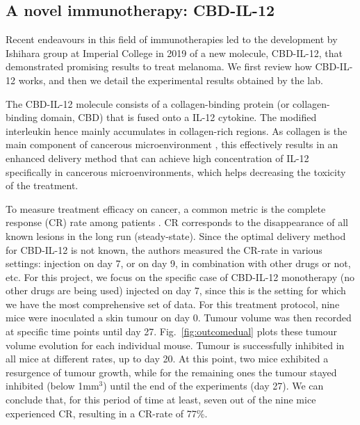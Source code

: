 \documentclass[11pt]{article}
\begin{document}
\subsection{A novel immunotherapy: CBD-IL-12}
Recent endeavours in this field of immunotherapies led to the development by Ishihara group at Imperial College in 2019 \cite{cbdil12} of a new molecule, CBD-IL-12, that demonstrated promising results to treat melanoma. We first review how CBD-IL-12 works, and then we detail the experimental results obtained by the lab. 

The CBD-IL-12  molecule consists of a collagen-binding protein (or collagen-binding domain, CBD) that is fused onto a IL-12 cytokine. The modified interleukin hence mainly accumulates in collagen-rich regions. As collagen is the main component of cancerous microenvironment \cite{collagenInCancer}, this effectively results in an enhanced delivery method that can achieve high concentration of IL-12 specifically in cancerous microenvironments, which helps decreasing the toxicity of the treatment.

To measure treatment efficacy on cancer, a common metric is the complete response (CR) rate among patients \cite{cancMetric}. CR corresponds to the disappearance of all known lesions \cite{CRDef} in the long run (steady-state). Since the optimal delivery method for CBD-IL-12 is not known, the authors measured the CR-rate in various settings: injection on day 7, or on day 9, in combination with other drugs or not, etc. For this project, we focus on the specific case of CBD-IL-12 monotherapy (no other drugs are being used) injected on day 7, since this is the setting for which we have the most comprehensive set of data. For this treatment protocol, nine mice were inoculated a skin tumour on day 0. Tumour volume was then recorded at specific time points until day 27. Fig.~\ref{fig:outcomedual} plots these tumour volume evolution for each individual mouse. Tumour is successfully inhibited in all mice at different rates, up to day 20. At this point, two mice exhibited a resurgence of tumour growth, while for the remaining ones the tumour stayed inhibited (below 1mm$^3$) until the end of the experiments (day 27). We can conclude that, for this period of time at least, seven out of the nine mice experienced CR, resulting in a CR-rate of 77\%.
\end{document}
